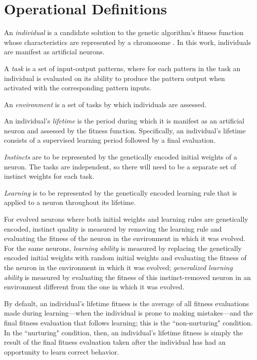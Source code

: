 \documentclass[master]{outhesis}
\begin{document}
\chapter{Operational Definitions}

An \emph{individual} is a candidate solution to the genetic algorithm's fitness function whose characteristics are represented by a chromosome \citep{Engelbrecht:2007aa}. In this work, individuals are manifest as artificial neurons. 

A \emph{task} is a set of input-output patterns,
where for each pattern in the task an individual is evaluated on its ability to produce the pattern output when activated with the corresponding pattern inputs.

An \emph{environment} is a set of tasks by which individuals are assessed.

An individual's \emph{lifetime} is the period during which it is manifest as an artificial neuron and assessed by the fitness function. Specifically, an individual's lifetime consists of a supervised learning period followed by a final evaluation.

\emph{Instincts} are to be represented by the genetically encoded initial weights of a neuron. The tasks are independent, so there will need to be a separate set of instinct weights for each task.

\emph{Learning} is to be represented by the genetically encoded learning rule that is applied to a neuron throughout its lifetime.

For evolved neurons where both initial weights and learning rules are genetically encoded, instinct quality is measured by removing the learning rule and evaluating the fitness of the neuron in the environment in which it was evolved.
For the same neurons, \emph{learning ability} is measured by replacing the genetically encoded initial weights with random initial weights and evaluating the fitness of the neuron in the environment in which it was evolved; \emph{generalized learning ability} is measured by evaluating the fitness of this instinct-removed neuron in an environment different from the one in which it was evolved.

By default, an individual's lifetime fitness is the average of all fitness evaluations made during learning---when the individual is prone to making mistakes---and the final fitness evaluation that follows learning; this is the ``non-nurturing" condition.
In the ``nurturing" condition, then, an individual's lifetime fitness is simply the result of the final fitness evaluation taken after the individual has had an opportunity to learn correct behavior.
\end{document}
